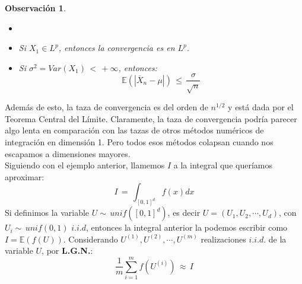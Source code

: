 \documentclass[a4paper]{article}
\numberwithin{equation}{subsection}
\numberwithin{definicion}{subsection}
\newtheorem{obs}{Observación}
\def\E{\mathbb E}
\begin{document}
\begin{obs}
\begin{itemize}
    \item[]
    \item Si $X_1 \in L^p$, entonces la convergencia es en $L^p$.
    \item Si $\sigma^2 = Var(X_1)\,<\,+\infty$, entonces:
    \[\E\left( \left|\overline{X}_n-\mu\right|\right)\,\leq\,\frac{\sigma}{\sqrt{n}}\]
\end{itemize}
\end{obs}
Además de esto, la taza de convergencia es del orden de $n^{1/2}$ y está dada por el Teorema Central del Límite. Claramente, la taza de convergencia podría parecer algo lenta en comparación con las tazas de otros métodos numéricos de integración en dimensión 1. Pero todos esos métodos colapsan cuando nos escapamos a dimensiones mayores.\newline \\
Siguiendo con el ejemplo anterior, llamemos $I$ a la integral que queríamos aproximar:
\[I\,=\,\int_{[0,1]^d}f(x)dx\]
Si definimos la variable $U\sim\,unif([0,1]^d)$, es decir $U=(U_1,U_2,\cdots,U_d)$, con $U_i\sim\,unif(0,1)$ $i.i.d$, entonces la integral anterior la podemos escribir como $I=\E(f(U))$. Considerando $U^{(1)},U^{(2)},\cdots,U^{(m)}$ realizaciones $i.i.d.$ de la variable $U$, por \textbf{L.G.N.}:
\[\frac{1}{m}\sum_{i=1}^m f(U^{(i)})\,\approx\,I\]
\end{document}
